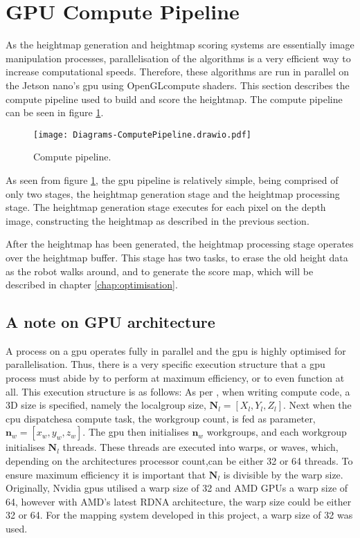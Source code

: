     \section{GPU Compute Pipeline}
        As the heightmap generation and heightmap scoring systems are essentially image manipulation processes, parallelisation of the algorithms is a very efficient way to increase computational speeds. Therefore, these algorithms are run in parallel on the Jetson nano's \ac{gpu} using OpenGLcompute shaders. This section describes the compute pipeline used to build and score the heightmap. The compute pipeline can be seen in figure \ref{fig:compute_pipe}.
        \begin{figure}[h]
            \centering
            \texttt{[image: Diagrams-ComputePipeline.drawio.pdf]}
            \caption{Compute pipeline.}
            \label{fig:compute_pipe}
        \end{figure}
    
        \noindent
        As seen from figure \ref{fig:compute_pipe}, the \ac{gpu} pipeline is relatively simple, being comprised of only two stages, the heightmap generation stage and the heightmap processing stage. The heightmap generation stage executes for each pixel on the depth image, constructing the heightmap as described in the previous section.
        
        After the heightmap has been generated, the heightmap processing stage operates over the heightmap buffer. This stage has two tasks, to erase the old height data as the robot walks around, and to generate the score map, which will be described in chapter \ref{chap:optimisation}.
        
        \subsection{A note on GPU architecture}
            A process on a \ac{gpu} operates fully in parallel and the \ac{gpu} is highly optimised for parallelisation. Thus, there is a very specific execution structure that a \ac{gpu} process must abide by to perform at maximum efficiency, or to even function at all. This execution structure is as follows: As per \cite{nvidia_doc}, when writing compute code, a 3D size is specified, namely the localgroup size, \(\bm{N}_{l} = [X_l,Y_{l},Z_{l}]\). Next when the \ac{cpu} dispatchesa compute task, the workgroup count, is fed as parameter, \(\bm{n}_{w} = [x_{w},y_{w},z_{w}]\). The \ac{gpu} then initialises \(\bm{n}_w\) workgroups, and each workgroup initialises \(\bm{N}_l\) threads. These threads are executed into warps, or waves, which, depending on the architectures processor count,can be either 32 or 64 threads. To ensure maximum efficiency it is important that \(\bm{N}_l\) is divisible by the warp size.
            Originally, Nvidia \ac{gpu}s utilised a warp size of 32 and AMD GPUs a warp size of 64, however with AMD's latest RDNA architecture, the warp size could be either 32 or 64. For the mapping system developed in this project, a warp size of 32 was used.
            
